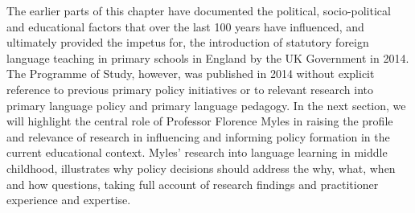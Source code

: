 \documentclass[output=paper]{langscibook}
\begin{document}
The earlier parts of this chapter have documented the political, socio-political and educational factors that over the last 100 years have influenced, and ultimately provided the impetus for, the introduction of statutory foreign language teaching in primary schools in England by the UK Government in 2014. The Programme of Study, however, was published in 2014 without explicit reference to previous primary policy initiatives or to relevant research into primary language policy and primary language pedagogy. In the next section, we will highlight the central role of Professor Florence Myles in raising the profile and relevance of research in influencing and informing policy formation in the current educational context. Myles’ research into language learning in middle childhood, illustrates why policy decisions should address the why, what, when and how questions, taking full account of research findings and practitioner experience and expertise. 
\end{document}
